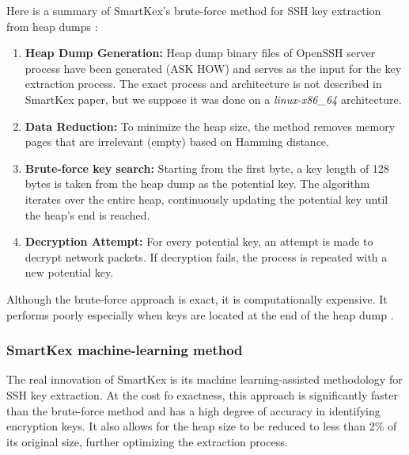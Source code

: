         Here is a summary of SmartKex's brute-force method for SSH key extraction from heap dumps \cite{SmartKex22}:
        \begin{enumerate}
            \item \textbf{Heap Dump Generation:} Heap dump binary files of OpenSSH server process have been generated (ASK HOW) and serves as the input for the key extraction process. The exact process and architecture is not described in SmartKex paper, but we suppose it was done on a \textit{linux-x86\_64} architecture.
            
            \item \textbf{Data Reduction:} To minimize the heap size, the method removes memory pages that are irrelevant (empty) based on Hamming distance.
            
            \item \textbf{Brute-force key search:} Starting from the first byte, a key length of 128 bytes is taken from the heap dump as the potential key. The algorithm iterates over the entire heap, continuously updating the potential key until the heap's end is reached.
            
            \item \textbf{Decryption Attempt:} For every potential key, an attempt is made to decrypt network packets. If decryption fails, the process is repeated with a new potential key.
        \end{enumerate}
        
        Although the brute-force approach is exact, it is computationally expensive. It performs poorly especially when keys are located at the end of the heap dump \cite[section 6.2]{SmartKex22}.

        \subsubsection{SmartKex machine-learning method}

        The real innovation of SmartKex is its machine learning-assisted methodology for SSH key extraction. At the cost fo exactness, this approach is significantly faster than the brute-force method and has a high degree of accuracy in identifying encryption keys. It also allows for the heap size to be reduced to less than 2\% of its original size, further optimizing the extraction process.

